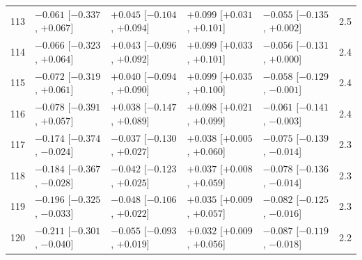 \begin{longtable}{rllllr}
113 & $-0.061$ {\scriptsize [$-0.337$, $+0.067$]} & $+0.045$ {\scriptsize [$-0.104$, $+0.094$]} & $+0.099$ {\scriptsize [$+0.031$, $+0.101$]} & $-0.055$ {\scriptsize [$-0.135$, $+0.002$]} & 2.5 \\
114 & $-0.066$ {\scriptsize [$-0.323$, $+0.064$]} & $+0.043$ {\scriptsize [$-0.096$, $+0.092$]} & $+0.099$ {\scriptsize [$+0.033$, $+0.101$]} & $-0.056$ {\scriptsize [$-0.131$, $+0.000$]} & 2.4 \\
115 & $-0.072$ {\scriptsize [$-0.319$, $+0.061$]} & $+0.040$ {\scriptsize [$-0.094$, $+0.090$]} & $+0.099$ {\scriptsize [$+0.035$, $+0.100$]} & $-0.058$ {\scriptsize [$-0.129$, $-0.001$]} & 2.4 \\
116 & $-0.078$ {\scriptsize [$-0.391$, $+0.057$]} & $+0.038$ {\scriptsize [$-0.147$, $+0.089$]} & $+0.098$ {\scriptsize [$+0.021$, $+0.099$]} & $-0.061$ {\scriptsize [$-0.141$, $-0.003$]} & 2.4 \\
117 & $-0.174$ {\scriptsize [$-0.374$, $-0.024$]} & $-0.037$ {\scriptsize [$-0.130$, $+0.027$]} & $+0.038$ {\scriptsize [$+0.005$, $+0.060$]} & $-0.075$ {\scriptsize [$-0.139$, $-0.014$]} & 2.3 \\
118 & $-0.184$ {\scriptsize [$-0.367$, $-0.028$]} & $-0.042$ {\scriptsize [$-0.123$, $+0.025$]} & $+0.037$ {\scriptsize [$+0.008$, $+0.059$]} & $-0.078$ {\scriptsize [$-0.136$, $-0.014$]} & 2.3 \\
119 & $-0.196$ {\scriptsize [$-0.325$, $-0.033$]} & $-0.048$ {\scriptsize [$-0.106$, $+0.022$]} & $+0.035$ {\scriptsize [$+0.009$, $+0.057$]} & $-0.082$ {\scriptsize [$-0.125$, $-0.016$]} & 2.3 \\
120 & $-0.211$ {\scriptsize [$-0.301$, $-0.040$]} & $-0.055$ {\scriptsize [$-0.093$, $+0.019$]} & $+0.032$ {\scriptsize [$+0.009$, $+0.056$]} & $-0.087$ {\scriptsize [$-0.119$, $-0.018$]} & 2.2 \\
\end{longtable}
